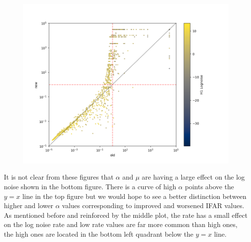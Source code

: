 %
\begin{figure}
    \centering
    \includegraphics[width=\textwidth]{images/5_pycbclive/all_full_h1_lognoise.png}
    \caption{}
    \label{fig:pycbclive-ifar-ifar-h1-log-noise-rate}
\end{figure}
%
It is not clear from these figures that $\alpha$ and $\mu$ are having a large effect on the log noise shown in the bottom figure. There is a curve of high $\alpha$ points above the $y=x$ line in the top figure but we would hope to see a better distinction between higher and lower $\alpha$ values corresponding to improved and worsened IFAR values. As mentioned before and reinforced by the middle plot, the rate has a small effect on the log noise rate and low rate values are far more common than high ones, the high ones are located in the bottom left quadrant below the $y=x$ line.

